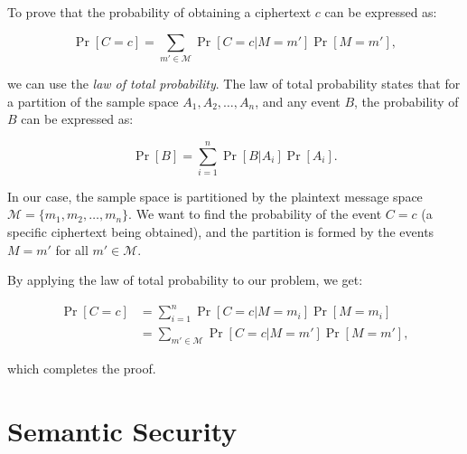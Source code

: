 \documentclass[12pt,openany]{book}
\theoremstyle{definition}
\begin{document}
	To prove that the probability of obtaining a ciphertext $c$ can be expressed as:
	
	\begin{equation}
		\Pr[C = c] = \sum_{m' \in \mathcal{M}} \Pr[C = c | M = m']\Pr[M = m'],
	\end{equation}
	
	\noindent we can use the \textit{law of total probability}. The law of total probability states that for a partition of the sample space $A_1, A_2, \dots, A_n$, and any event $B$, the probability of $B$ can be expressed as:
	
	\begin{equation}
		\Pr[B] = \sum_{i=1}^{n} \Pr[B | A_i] \Pr[A_i].
	\end{equation}
	
	In our case, the sample space is partitioned by the plaintext message space $\mathcal{M} = \{m_1, m_2, \dots, m_n\}$. We want to find the probability of the event $C = c$ (a specific ciphertext being obtained), and the partition is formed by the events $M = m'$ for all $m' \in \mathcal{M}$.
	
	By applying the law of total probability to our problem, we get:
	
	\begin{align*}
		\Pr[C = c] &= \sum_{i=1}^{n} \Pr[C = c | M = m_i] \Pr[M = m_i] \\
		&= \sum_{m' \in \mathcal{M}} \Pr[C = c | M = m'] \Pr[M = m'],
	\end{align*}
	
	which completes the proof.
	
	\newpage
	\section{Semantic Security}
	
\end{document}

